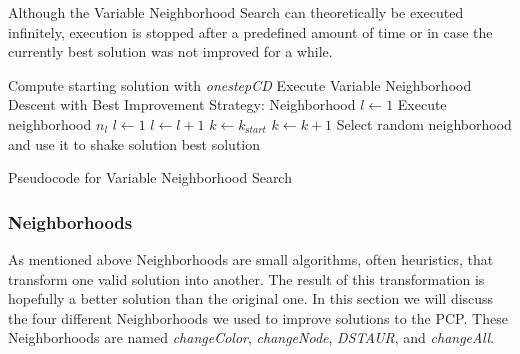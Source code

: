 \documentclass[paper=a4,fontsize=12pt]{scrartcl}
\begin{document}
{Although the Variable Neighborhood Search can theoretically be executed infinitely, execution is stopped after a predefined amount of time or in case the currently best solution was not improved for a while.


\begin{algorithm}
\begin{algorithmic}[1]
\State Compute starting solution with \emph{onestepCD}
\State Execute Variable Neighborhood Descent with Best Improvement Strategy:
\State Neighborhood $l \leftarrow 1$
\State Execute neighborhood $n_l$
\State  $l\leftarrow 1$  
\Else
\State  $l\leftarrow l + 1$
\EndIf
\EndWhile
{}
\State $k \leftarrow k_{\mathrm start}$ 
\Else
\State $k \leftarrow k + 1$
\EndIf
\State Select random neighborhood and use it to shake solution
\EndWhile
\State\Return best solution
\end{algorithmic}
\caption{Pseudocode for Variable Neighborhood Search}
\end{algorithm}
}

\subsubsection{Neighborhoods}
\label{sec:neigh}
As mentioned above Neighborhoods are small algorithms, often heuristics, that transform one valid solution into another. The result of this transformation is hopefully a better solution than the original one. In this section we will discuss the four different Neighborhoods we used to improve solutions to the PCP. These Neighborhoods are named \emph{changeColor}, \emph{changeNode}, \emph{DSTAUR}, and \emph{changeAll}.

\end{document}
